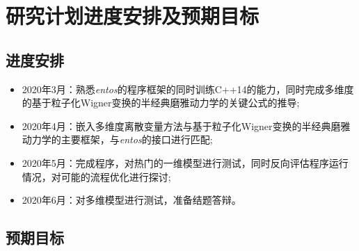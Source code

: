 \section{研究计划进度安排及预期目标}

\subsection{进度安排}
\begin{itemize}
	\item 2020年3月：熟悉\emph{entos}的程序框架的同时训练C++14的能力，同时完成多维度的基于粒子化Wigner变换的半经典磨雅动力学的关键公式的推导;
	\item 2020年4月：嵌入多维度离散变量方法与基于粒子化Wigner变换的半经典磨雅动力学的主要框架，与\emph{entos}的接口进行匹配;
	\item 2020年5月：完成程序，对热门的一维模型进行测试，同时反向评估程序运行情况，对可能的流程优化进行探讨;
	\item 2020年6月：对多维模型进行测试，准备结题答辩。
\end{itemize}


\subsection{预期目标}
